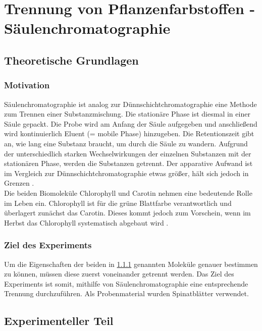 \documentclass{article}
\begin{document}
  \pagebreak
  
  \section{Trennung von Pflanzenfarbstoffen - Säulenchromatographie}
  
    \subsection{Theoretische Grundlagen}
    
      \subsubsection{Motivation} \label{sec:Motivationzwei}
      
        Säulenchromatographie ist analog zur Dünnschichtchromatographie eine Methode zum Trennen einer Substanzmischung. Die stationäre Phase ist diesmal in einer Säule gepackt. Die Probe wird am Anfang der Säule aufgegeben und anschließend wird kontinuierlich Eluent (= mobile Phase) hinzugeben. Die Retentionszeit gibt an, wie lang eine Substanz braucht, um durch die Säule zu wandern. Aufgrund der unterschiedlich starken Wechselwirkungen der einzelnen Substanzen mit der stationären Phase, werden die Substanzen getrennt. Der apparative Aufwand ist im Vergleich zur Dünnschichtchromatographie etwas größer, hält sich jedoch in Grenzen \cite[S. 154]{TaschenatlasAnallytik}.\\
        
        Die beiden Biomoleküle Chlorophyll und Carotin nehmen eine bedeutende Rolle im Leben ein. Chlorophyll ist für die grüne Blattfarbe verantwortlich und überlagert zunächst das Carotin. Dieses kommt jedoch zum Vorschein, wenn im Herbst das Chlorophyll systematisch abgebaut wird \cite{DegradationChlorophyll}. 
      
      \subsubsection{Ziel des Experiments}
      
        Um die Eigenschaften der beiden in \ref{sec:Motivationzwei} genannten Moleküle genauer bestimmen zu können, müssen diese zuerst voneinander getrennt werden. Das Ziel des Experiments ist somit, mithilfe von Säulenchromatographie eine entsprechende Trennung durchzuführen. Als Probenmaterial wurden Spinatblätter verwendet.
    
    \subsection{Experimenteller Teil}
    
\end{document}
